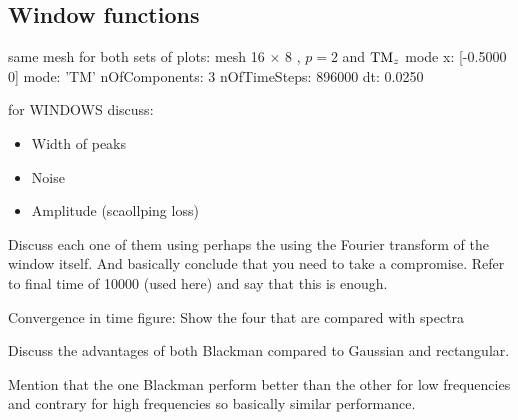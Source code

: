 \clearpage
\subsection{Window functions}
same mesh for both sets of plots:
mesh 16 $\times$ 8 , $p = 2$ and $\textrm{TM}_{z}$ mode
                x: [-0.5000 0]
             mode: 'TM'
    nOfComponents: 3
     nOfTimeSteps: 896000
               dt: 0.0250
\begin{figure}[!ht]
	\centering
{} 
\end{figure}
\begin{figure}[!ht]
	\centering
{}
\end{figure}
for WINDOWS discuss:
\begin{itemize}
\item Width of peaks
\item Noise
\item Amplitude (scaollping loss)
\end{itemize}
Discuss each one of them using perhaps the using the Fourier transform of the window itself. And basically conclude that you need to take a compromise. Refer to final time of 10000 (used here) and say that this is enough.

Convergence in time figure:
Show the four that are compared with spectra

Discuss the advantages of both Blackman compared to Gaussian and rectangular.

Mention that the one Blackman perform better than the other for low frequencies and contrary for high frequencies so basically similar performance.
\begin{figure}[!ht]
	\centering
	\label{fig:rectangle2DfreeSpace_filteringConvergence}
\end{figure}
\clearpage

